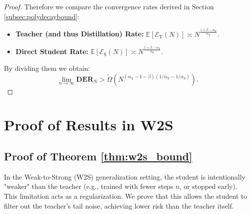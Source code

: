 \documentclass{article}
\theoremstyle{definition}
\theoremstyle{definition}
\theoremstyle{plain}
\theoremstyle{plain}
\theoremstyle{plain}
\theoremstyle{plain}
\theoremstyle{plain}
\newcommand{\Ex}{\mathbb{E}}
\newcommand{\te}{\mathrm{T}}
\newcommand{\st}{\mathrm{S}}
\begin{document}
\begin{proof}
    
    Therefore we compare the convergence rates derived in Section \ref{subsec:polydecaybound}:
    \begin{itemize}
        \item \textbf{Teacher (and thus Distillation) Rate:} $\Ex[\mathcal{E}_{\mathrm{T}}(N)] \asymp N^{\frac{1+\beta-\alpha_\te}{\alpha_\te}}$.
        \item \textbf{Direct Student Rate:} $\Ex[\mathcal{E}_{\mathrm{S}}(N)] \asymp N^{\frac{1+\beta-\alpha_\te}{\alpha_\st}}$.
    \end{itemize}
    By dividing them we obtain:
    \begin{equation}
        \lim_{n\to\infty}\mathbf{DER}_N > \widetilde{{\Omega}}(N^{(\alpha_\te-1-\beta)\left(1/{\alpha_\te}-1/{\alpha_\st}\right)}).
    \end{equation} 
\end{proof}










\section{Proof of Results in W2S}
\subsection{Proof of Theorem \ref{thm:w2s_bound}}
\label{proof:w2s_bound}

In the Weak-to-Strong (W2S) generalization setting, the student is intentionally "weaker" than the teacher (e.g., trained with fewer steps $n$, or stopped early). This limitation acts as a regularization. We prove that this allows the student to filter out the teacher's tail noise, achieving lower risk than the teacher itself.
\end{document}
